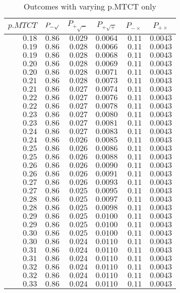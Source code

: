 %
\begin{table}[\hbtp]
 \small
 \begin{center}
 \begin{tabular}{rrrrrr}\hline\hline
\multicolumn{1}{c}{$p.MTCT$}&\multicolumn{1}{c}{$P_{-\surd}$}&\multicolumn{1}{c}{$P_{+\surd - }$}&\multicolumn{1}{c}{$P_{+\surd +}$}&\multicolumn{1}{c}{$P_{-\times}$}&\multicolumn{1}{c}{$P_{+\times}$}\tabularnewline
\hline
$0.18$&$0.86$&$0.029$&$0.0064$&$0.11$&$0.0043$\tabularnewline
$0.19$&$0.86$&$0.028$&$0.0066$&$0.11$&$0.0043$\tabularnewline
$0.19$&$0.86$&$0.028$&$0.0068$&$0.11$&$0.0043$\tabularnewline
$0.20$&$0.86$&$0.028$&$0.0069$&$0.11$&$0.0043$\tabularnewline
$0.20$&$0.86$&$0.028$&$0.0071$&$0.11$&$0.0043$\tabularnewline
$0.21$&$0.86$&$0.028$&$0.0073$&$0.11$&$0.0043$\tabularnewline
$0.21$&$0.86$&$0.027$&$0.0074$&$0.11$&$0.0043$\tabularnewline
$0.22$&$0.86$&$0.027$&$0.0076$&$0.11$&$0.0043$\tabularnewline
$0.22$&$0.86$&$0.027$&$0.0078$&$0.11$&$0.0043$\tabularnewline
$0.23$&$0.86$&$0.027$&$0.0080$&$0.11$&$0.0043$\tabularnewline
$0.23$&$0.86$&$0.027$&$0.0081$&$0.11$&$0.0043$\tabularnewline
$0.24$&$0.86$&$0.027$&$0.0083$&$0.11$&$0.0043$\tabularnewline
$0.24$&$0.86$&$0.026$&$0.0085$&$0.11$&$0.0043$\tabularnewline
$0.25$&$0.86$&$0.026$&$0.0086$&$0.11$&$0.0043$\tabularnewline
$0.25$&$0.86$&$0.026$&$0.0088$&$0.11$&$0.0043$\tabularnewline
$0.26$&$0.86$&$0.026$&$0.0090$&$0.11$&$0.0043$\tabularnewline
$0.26$&$0.86$&$0.026$&$0.0091$&$0.11$&$0.0043$\tabularnewline
$0.27$&$0.86$&$0.026$&$0.0093$&$0.11$&$0.0043$\tabularnewline
$0.27$&$0.86$&$0.025$&$0.0095$&$0.11$&$0.0043$\tabularnewline
$0.28$&$0.86$&$0.025$&$0.0097$&$0.11$&$0.0043$\tabularnewline
$0.28$&$0.86$&$0.025$&$0.0098$&$0.11$&$0.0043$\tabularnewline
$0.29$&$0.86$&$0.025$&$0.0100$&$0.11$&$0.0043$\tabularnewline
$0.29$&$0.86$&$0.025$&$0.0100$&$0.11$&$0.0043$\tabularnewline
$0.30$&$0.86$&$0.025$&$0.0100$&$0.11$&$0.0043$\tabularnewline
$0.30$&$0.86$&$0.024$&$0.0110$&$0.11$&$0.0043$\tabularnewline
$0.31$&$0.86$&$0.024$&$0.0110$&$0.11$&$0.0043$\tabularnewline
$0.31$&$0.86$&$0.024$&$0.0110$&$0.11$&$0.0043$\tabularnewline
$0.32$&$0.86$&$0.024$&$0.0110$&$0.11$&$0.0043$\tabularnewline
$0.32$&$0.86$&$0.024$&$0.0110$&$0.11$&$0.0043$\tabularnewline
$0.33$&$0.86$&$0.024$&$0.0110$&$0.11$&$0.0043$\tabularnewline
\hline
\end{tabular}

\end{center}

\caption{Outcomes with varying p.MTCT only\label{tbl:p.MTCT_varying_only}} 

\end{table}


